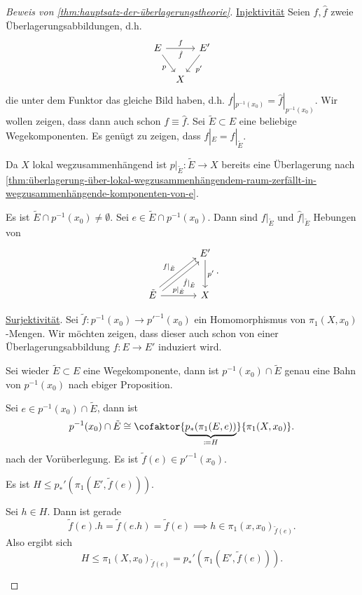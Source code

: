 \begin{proof}[Beweis von \autoref{thm:hauptsatz-der-überlagerungstheorie}]
    \underline{Injektivität} Seien $f,\hat{f}$ zweie Überlagerungsabbildungen, d.h.
    \[
    \begin{tikzcd}[column sep = tiny]
        E \ar{rr}{f}[swap]{\hat{f}} \ar[swap]{dr}{p} & & E' \ar{dl}{p'} \\
    & X
    \end{tikzcd}
    \]
    die unter dem Funktor das gleiche Bild haben, d.h. $f|_{p^{-1} (x_0)} = \hat{f}|_{p^{-1} (x_0)}$. Wir wollen zeigen, dass dann auch schon $f \equiv  \hat{f}$. Sei $\tilde{E} \subset E$ eine beliebige Wegekomponenten. Es genügt zu zeigen, dass $f|_E = \hat{f}|_{\tilde{E}}$.

    Da $X$ lokal wegzusammenhängend ist  $p|_{\tilde{E}}\colon \tilde{E} \to  X$ bereits eine Überlagerung nach \autoref{thm:überlagerung-über-lokal-wegzusammenhängendem-raum-zerfällt-in-wegzusammenhängende-komponenten-von-e}.

    Es ist $\tilde{E} \cap  p^{-1} (x_0) \neq  \emptyset$. Sei $e\in \tilde{E} \cap  p^{-1} (x_0)$. Dann sind $f|_{\tilde{E}}$ und $\hat{f}|_{\tilde{E}}$ Hebungen von
    \[
        \begin{tikzcd}[column sep = large, row sep = large]
        & E' \ar{d}{p'} \\
        \tilde{E} \ar[shift left]{ur}{f|_{\tilde{E}}} \ar[shift right, swap]{ur}{\hat{f}|_{\tilde{E}}} \ar{r}{p|_{\tilde{E}}} & X
    \end{tikzcd}
    .\] 

    \underline{Surjektivität}. Sei $\tilde{f} \colon  p^{-1} (x_0) \to  p'^{-1}(x_0)$ ein Homomorphismus von $\pi_1(X,x_0)$-Mengen. Wir möchten zeigen, dass dieser auch schon von einer Überlagerungsabbildung $f\colon  E \to  E'$ induziert wird. 

    Sei wieder $\tilde{E} \subset E$ eine Wegekomponente, dann ist $p^{-1} (x_0) \cap \tilde{E}$ genau eine Bahn von $p^{-1} (x_0)$ nach ebiger Proposition.

    Sei $e\in p^{-1} (x_0) \cap \tilde{E}$, dann ist
    \[
        p^{-1} (x_0) \cap  \tilde{E} \cong \cofaktor{\underbrace{p_*(\pi_1(E,e))}_{\coloneqq H}}{\pi_1(X,x_0)}
    .\] 
    nach der Vorüberlegung. Es ist $\tilde{f}(e) \in p'^{-1}(x_0)$.

    \begin{claim}
        Es ist $H\leq  p_*'(\pi_1(E',\tilde{f}(e)))$.
    \end{claim}
    \begin{subproof}
        Sei $h\in H$. Dann ist gerade
        \[
            \tilde{f}(e).  h = \tilde{f}(e.h) = \tilde{f}(e) \implies h\in \pi_1(x,x_0)_{\tilde{f}(e)}
        .\] 
        Also ergibt sich
        \[
            H \leq  \pi_1(X,x_0)_{\tilde{f}(e)} = p_*'(\pi_1(E',\tilde{f}(e)))
        .\] 
    \end{subproof}


\end{proof}
